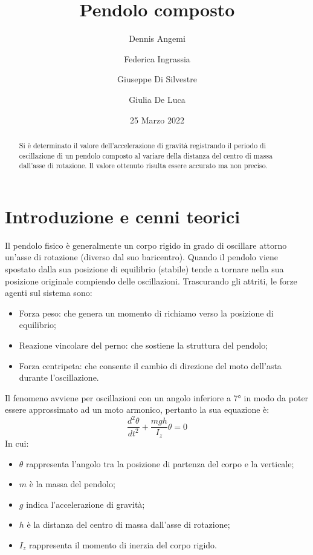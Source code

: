 \documentclass[11pt,a4paper]{article}
\title{Pendolo composto}
\author[1]{Dennis Angemi}%
\author[1]{Federica Ingrassia}%
\author[1]{Giuseppe Di Silvestre}%
\author[1]{Giulia De Luca}%
\affil[1]{Dipartimento di Fisica e Astronomia ``Ettore Majorana'' - Università degli Studi di Catania}%
\date{25 Marzo 2022}
\begin{document}
\maketitle

\begin{abstract}
    Si è determinato il valore dell'accelerazione di gravità registrando il periodo di oscillazione di un pendolo composto al variare della distanza del centro di massa dall'asse di rotazione. Il valore ottenuto risulta essere accurato ma non preciso.
\end{abstract}

\section{Introduzione e cenni teorici}
Il pendolo fisico è generalmente un corpo rigido in grado di oscillare attorno un'asse di rotazione (diverso dal suo baricentro).
Quando il pendolo viene spostato dalla sua posizione di equilibrio (stabile) tende a tornare nella sua posizione originale compiendo delle oscillazioni. 
Trascurando gli attriti, le forze agenti sul sistema sono:
\begin{itemize}
    \item Forza peso: che genera un momento di richiamo verso la posizione di equilibrio;
    \item Reazione vincolare del perno: che sostiene la struttura del pendolo;
    \item Forza centripeta: che consente il cambio di direzione del moto dell'asta durante l'oscillazione.
\end{itemize}
Il fenomeno avviene per oscillazioni con un angolo inferiore a 7° in modo da poter essere approssimato ad un moto armonico, pertanto la sua equazione è:
\begin{equation}
    \frac{d^2\theta}{dt^2}+\frac{mgh}{I_z}\theta=0
\end{equation}
In cui:
\begin{itemize}
    \item $\theta$ rappresenta l'angolo tra la posizione di partenza del corpo e la verticale;
    \item $m$ è la massa del pendolo;
    \item $g$ indica l'accelerazione di gravità;
    \item $h$ è la distanza del centro di massa dall'asse di rotazione;
    \item $I_z$ rappresenta il momento di inerzia del corpo rigido.
    
\end{itemize}
\end{document}
